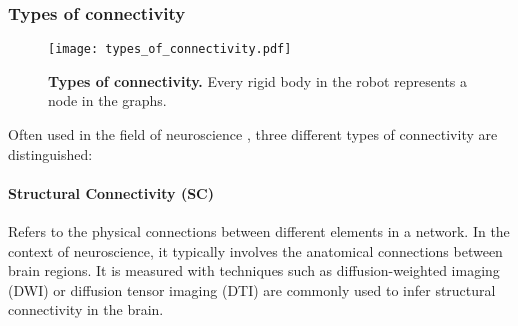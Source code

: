 \subsubsection{Types of connectivity}

\begin{figure*}[!h]
	\centering	
	\hspace*{\fill}
	\texttt{[image: types\_of\_connectivity.pdf]}
	\hspace*{\fill}	
	\caption[] {\label{fig:types_of_connectivity}\textbf{Types of connectivity.} Every rigid body in the robot represents a node in the graphs.}
\end{figure*}

Often used in the field of neuroscience \cite{Karwowski2019Applicationgraphtheory}, three different types of connectivity are distinguished\cite{Park2013Structuralfunctionalbrain,FaskowitzEdgesbrainnetworks}:

\paragraph*{Structural Connectivity (SC)} Refers to the physical connections between different elements in a network. In the context of neuroscience, it typically involves the anatomical connections between brain regions. It is measured with techniques such as diffusion-weighted imaging (DWI) or diffusion tensor imaging (DTI) are commonly used to infer structural connectivity in the brain.

